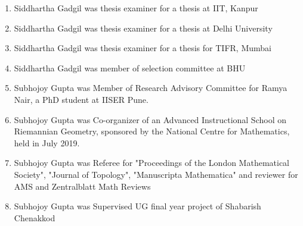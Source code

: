 \begin{enumerate}
\item Siddhartha Gadgil was thesis examiner for a thesis at IIT, Kanpur
\item Siddhartha Gadgil was thesis examiner for a thesis at Delhi University
\item Siddhartha Gadgil was thesis examiner for a thesis for TIFR, Mumbai
\item Siddhartha Gadgil was member of selection committee at BHU
\item Subhojoy Gupta was Member of Research Advisory Committee for Ramya Nair, a PhD student at IISER Pune. 
\item Subhojoy Gupta was Co-organizer of an Advanced Instructional School on Riemannian Geometry, sponsored by the National Centre for Mathematics, held in July 2019.
\item Subhojoy Gupta was Referee for "Proceedings of the London Mathematical Society", "Journal of Topology", "Manuscripta Mathematica" and reviewer for AMS and Zentralblatt Math Reviews
\item Subhojoy Gupta was Supervised UG final year project of Shabarish Chenakkod
\end{enumerate}

